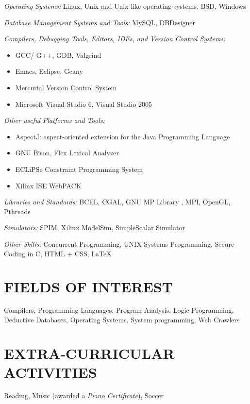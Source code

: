\documentclass[margin]{res}
\begin{document}
\begin{resume}
        {\sl Operating Systems:}
        Linux, Unix and Unix-like operating systems, BSD, Windows

        {\sl Database Management Systems and Tools:}
        MySQL, DBDesigner

        {\sl Compilers, Debugging Tools, Editors, IDEs, and Version Control Systems:}
        \begin{itemize}
        \item GCC/ G++, GDB, Valgrind
        \item Emacs, Eclipse, Geany
        \item Mercurial Version Control System
        \item Microsoft Visual Studio 6, Visual Studio 2005
        \end{itemize}

        {\sl Other useful Platforms and Tools:}
        \begin{itemize}
        \item AspectJ: aspect-oriented extension for the Java Programming Language
        \item GNU Bison, Flex Lexical Analyzer
        \item ECLiPSe Constraint Programming System
        \item Xilinx ISE WebPACK
        \end{itemize}

        {\sl Libraries and Standards:}
        BCEL, CGAL, GNU MP Library , MPI, OpenGL, Pthreads

        {\sl Simulators:}
        SPIM, Xilinx ModelSim, SimpleScalar Simulator

        {\sl Other Skills:}
        Concurrent Programming, UNIX Systems Programming, Secure Coding in C, HTML + CSS, \LaTeX

\section{FIELDS OF INTEREST} Compilers, Programming Languages, Program Analysis, Logic Programming, \\ 
Deductive Databases, Operating Systems, System programming, Web Crawlers

\section{EXTRA-CURRICULAR \\ ACTIVITIES}             
Reading, Music (awarded a {\it Piano Certificate}), Soccer

\end{resume}
\end{document}
